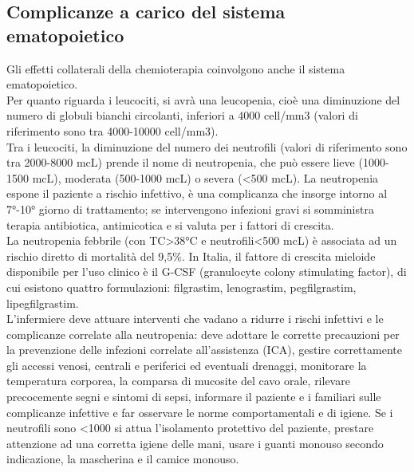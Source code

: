 \subsection{Complicanze a carico del sistema ematopoietico}

Gli effetti collaterali della chemioterapia coinvolgono anche il sistema ematopoietico.\\
Per quanto riguarda i leucociti, si avrà una leucopenia, cioè una diminuzione del numero di globuli bianchi 
circolanti, inferiori a 4000 cell/mm3 (valori di riferimento sono tra 4000-10000 cell/mm3).\\ 
Tra i leucociti, la diminuzione del numero dei neutrofili (valori di riferimento sono tra 2000-8000 mcL) 
prende il nome di neutropenia, che può essere lieve (1000-1500 mcL), moderata (500-1000 mcL) o severa (<500 mcL). 
La neutropenia espone il paziente a rischio infettivo, è una complicanza che insorge intorno al 7°-10° giorno di 
trattamento; se intervengono infezioni gravi si somministra terapia antibiotica, antimicotica e si valuta per i 
fattori di crescita\cite{AIOMTOSS}.\\

La neutropenia febbrile (con TC>38°C e neutrofili<500 mcL) è associata ad un rischio diretto di mortalità del 9,5\%. 
In Italia, il fattore di crescita mieloide disponibile per l’uso clinico è il G-CSF (granulocyte colony 
stimulating factor), di cui esistono quattro formulazioni: filgrastim, lenograstim, pegfilgrastim, lipegfilgrastim\cite{AIOMTOSS}.\\
L’infermiere deve attuare interventi che vadano a ridurre i rischi infettivi e le complicanze correlate alla 
neutropenia: deve adottare le corrette precauzioni per la prevenzione delle infezioni correlate all’assistenza (ICA), 
gestire correttamente gli accessi venosi, centrali e periferici ed eventuali drenaggi, monitorare la temperatura 
corporea, la comparsa di mucosite del cavo orale, rilevare precocemente segni e sintomi di sepsi, informare il 
paziente e i familiari sulle complicanze infettive e far osservare le norme comportamentali e di igiene. 
Se i neutrofili sono <1000 si attua l’isolamento protettivo del paziente, prestare attenzione ad una corretta 
igiene delle mani, usare i guanti monouso secondo indicazione, la mascherina e il camice monouso\cite{ISOLAMENTO}.\\

